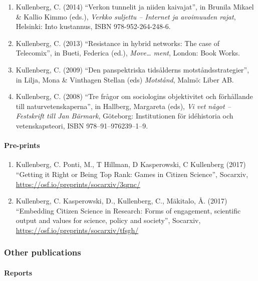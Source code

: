 \documentclass[
]{article}
\providecommand{\tightlist}{%
  \setlength{\itemsep}{0pt}\setlength{\parskip}{0pt}}
\begin{document}
\begin{enumerate}
\def\labelenumi{\arabic{enumi}.}
\tightlist
\item
  Kullenberg, C. (2014) ``Verkon tunnelit ja niiden kaivajat'', in
  Brunila Mikael \& Kallio Kimmo (eds.), \emph{Verkko suljettu --
  Internet ja avoimuuden rajat}, Helsinki: Into kustannus, ISBN
  978-952-264-248-6.
\item
  Kullenberg, C. (2013) ``Resistance in hybrid networks: The case of
  Telecomix'', in Bueti, Federica (ed.), \emph{Move\ldots{} ment},
  London: Book Works.
\item
  Kullenberg, C. (2009) ``Den panspektriska tidsålderns
  motståndsstrategier'', in Lilja, Mona \& Vinthagen Stellan (eds)
  \emph{Motstånd}, Malmö: Liber AB.
\item
  Kullenberg, C. (2008) ``Tre frågor om sociologins objektivitet och
  förhållande till naturvetenskaperna'', in Hallberg, Margareta (eds),
  \emph{Vi vet något -- Festskrift till Jan Bärmark}, Göteborg:
  Institutionen för idéhistoria och vetenskapsteori, ISBN
  978--91--976239--1--9.
\end{enumerate}

\hypertarget{pre-prints}{%
\paragraph{Pre-prints}\label{pre-prints}}

\begin{enumerate}
\def\labelenumi{\arabic{enumi}.}
\tightlist
\item
  Kullenberg, C. Ponti, M., T Hillman, D Kasperowski, C Kullenberg
  (2017) ``Getting it Right or Being Top Rank: Games in Citizen
  Science'', Socarxiv, \url{https://osf.io/preprints/socarxiv/3qrnc/}
\item
  Kullenberg, C. Kasperowski, D., Kullenberg, C., Mäkitalo, Å. (2017)
  ``Embedding Citizen Science in Research: Forms of engagement,
  scientific output and values for science, policy and society'',
  Socarxiv, \url{https://osf.io/preprints/socarxiv/tfsgh/}
\end{enumerate}

\hypertarget{other-publications}{%
\subsubsection{Other publications}\label{other-publications}}

\hypertarget{reports}{%
\paragraph{Reports}\label{reports}}
\end{document}
